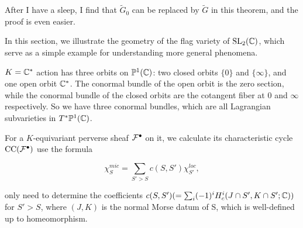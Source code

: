 \begin{rk}
  After I have a sleep, I find that $\widetilde{G}_0$ can be replaced by $\widetilde{G}$ in this theorem, and the proof is even easier.
\end{rk}






In this section, we illustrate the geometry of the flag variety of $\operatorname{SL}_2(\mathbb{C})$, which serve as a simple example for understanding more general phenomena.


$K = \mathbb{C}^*$ action has three orbits on $\mathbb{P}^1(\mathbb{C})$: two closed orbits $\{0\}$ and $\{\infty\}$, and one open orbit $\mathbb{C}^*$. The conormal bundle of the open orbit is the zero section, while the conormal bundle of the closed orbits are the cotangent fiber at $0$ and $\infty$ respectively. So we have three conormal bundles, which are all Lagrangian subvarieties in $T^*\mathbb{P}^1(\mathbb{C})$.



\begin{center}
\end{center}

For a $K$-equivariant perverse sheaf $\mathcal{F}^{\bullet}$ on it, we calculate its characteristic cycle $\mathrm{CC}(\mathcal{F}^{\bullet})$ use the formula

\[
\chi^{mic}_{S} = \sum_{S' > S} c(S,S') \chi^{loc}_{S'},
\]


only need to determine the coefficients $c(S,S') (= \sum_i (-1)^i H^i_c(J \cap S', K \cap S'; \mathbb{C}))$ for $S' > S$, where $(J,K)$ is the normal Morse datum of S, which is well-defined up to homeomorphism.



